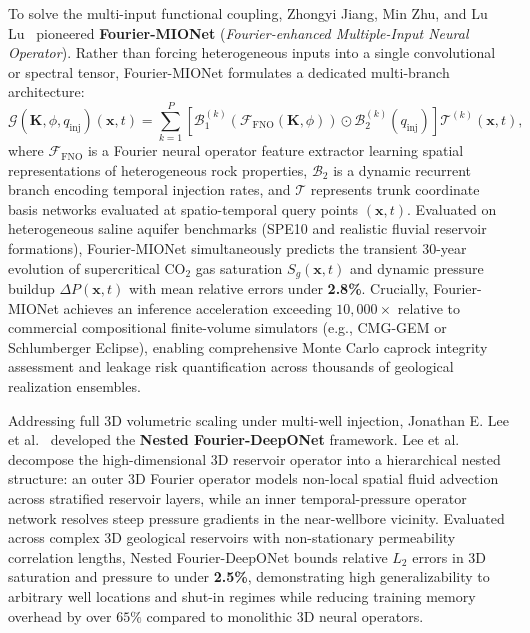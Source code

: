 To solve the multi-input functional coupling, Zhongyi Jiang, Min Zhu, and Lu Lu~\cite{jiang2024fouriermionet} pioneered \textbf{Fourier-MIONet} (\textit{Fourier-enhanced Multiple-Input Neural Operator}). Rather than forcing heterogeneous inputs into a single convolutional or spectral tensor, Fourier-MIONet formulates a dedicated multi-branch architecture:
\begin{equation}
    \mathcal{G}\left(\mathbf{K}, \phi, q_{\text{inj}}\right)(\mathbf{x}, t) = \sum_{k=1}^P \left[ \mathcal{B}_1^{(k)}\left(\mathcal{F}_{\text{FNO}}(\mathbf{K}, \phi)\right) \odot \mathcal{B}_2^{(k)}\left(q_{\text{inj}}\right) \right] \mathcal{T}^{(k)}(\mathbf{x}, t),
    \label{eq:fourier_mionet}
\end{equation}
where $\mathcal{F}_{\text{FNO}}$ is a Fourier neural operator feature extractor learning spatial representations of heterogeneous rock properties, $\mathcal{B}_2$ is a dynamic recurrent branch encoding temporal injection rates, and $\mathcal{T}$ represents trunk coordinate basis networks evaluated at spatio-temporal query points $(\mathbf{x}, t)$. Evaluated on heterogeneous saline aquifer benchmarks (SPE10 and realistic fluvial reservoir formations), Fourier-MIONet simultaneously predicts the transient 30-year evolution of supercritical $\text{CO}_2$ gas saturation $S_g(\mathbf{x}, t)$ and dynamic pressure buildup $\Delta P(\mathbf{x}, t)$ with mean relative errors under \textbf{2.8\%}. Crucially, Fourier-MIONet achieves an inference acceleration exceeding \textbf{$10{,}000\times$} relative to commercial compositional finite-volume simulators (e.g., CMG-GEM or Schlumberger Eclipse), enabling comprehensive Monte Carlo caprock integrity assessment and leakage risk quantification across thousands of geological realization ensembles.

Addressing full 3D volumetric scaling under multi-well injection, Jonathan E. Lee et al.~\cite{lee2024nested} developed the \textbf{Nested Fourier-DeepONet} framework. Lee et al. decompose the high-dimensional 3D reservoir operator into a hierarchical nested structure: an outer 3D Fourier operator models non-local spatial fluid advection across stratified reservoir layers, while an inner temporal-pressure operator network resolves steep pressure gradients in the near-wellbore vicinity. Evaluated across complex 3D geological reservoirs with non-stationary permeability correlation lengths, Nested Fourier-DeepONet bounds relative $L_2$ errors in 3D saturation and pressure to under \textbf{2.5\%}, demonstrating high generalizability to arbitrary well locations and shut-in regimes while reducing training memory overhead by over $65\%$ compared to monolithic 3D neural operators.



